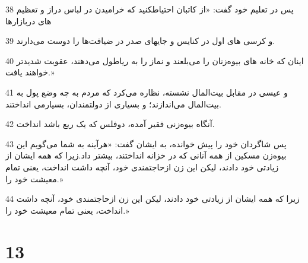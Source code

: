 \par 38 پس در تعلیم خود گفت: «از کاتبان احتیاطکنید که خرامیدن در لباس دراز و تعظیم های دربازارها
\par 39 و کرسی های اول در کنایس و جایهای صدر در ضیافت‌ها را دوست می‌دارند.
\par 40 اینان که خانه های بیوه‌زنان را می‌بلعند و نماز را به ریاطول می‌دهند، عقوبت شدیدتر خواهند یافت.»
\par 41 و عیسی در مقابل بیت‌المال نشسته، نظاره می‌کرد که مردم به چه وضع پول به بیت‌المال می‌اندازند؛ و بسیاری از دولتمندان، بسیارمی انداختند.
\par 42 آنگاه بیوه‌زنی فقیر آمده، دوفلس که یک ربع باشد انداخت.
\par 43 پس شاگردان خود را پیش خوانده، به ایشان گفت: «هرآینه به شما می‌گویم این بیوه‌زن مسکین از همه آنانی که در خزانه انداختند، بیشتر داد.زیرا که همه ایشان از زیادتی خود دادند، لیکن این زن ازحاجتمندی خود، آنچه داشت انداخت، یعنی تمام معیشت خود را.»
\par 44 زیرا که همه ایشان از زیادتی خود دادند، لیکن این زن ازحاجتمندی خود، آنچه داشت انداخت، یعنی تمام معیشت خود را.»

\chapter{13}

